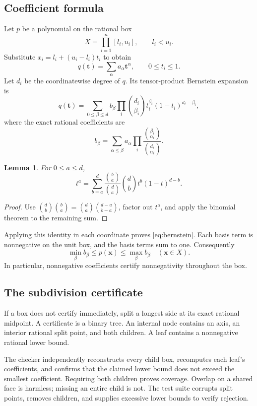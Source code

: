 \documentclass[11pt,a4paper]{article}
\newtheorem{lemma}[proposition]{Lemma}
\theoremstyle{definition}
\begin{document}
\subsection{Coefficient formula}

Let $p$ be a polynomial on the rational box
\[
 X=\prod_{i=1}^{n}[l_i,u_i],\qquad l_i<u_i.
\]
Substitute $x_i=l_i+(u_i-l_i)t_i$ to obtain
\[
 q(\bm t)=\sum_\alpha a_\alpha\bm t^\alpha,
 \qquad 0\le t_i\le1.
\]
Let $d_i$ be the coordinatewise degree of $q$. Its tensor-product Bernstein expansion is
\[
 q(\bm t)=\sum_{0\le\beta\le\bm d} b_\beta
   \prod_i\binom{d_i}{\beta_i}t_i^{\beta_i}(1-t_i)^{d_i-\beta_i},
\]
where the exact rational coefficients are
\begin{equation}
 b_\beta=\sum_{\alpha\le\beta}a_\alpha
     \prod_i\frac{\binom{\beta_i}{\alpha_i}}{\binom{d_i}{\alpha_i}}.
 \label{eq:bernstein}
\end{equation}

\begin{lemma}
For $0\le a\le d$,
\[
 t^a=\sum_{b=a}^{d}\frac{\binom ba}{\binom da}
                    \binom db t^b(1-t)^{d-b}.
\]
\end{lemma}
\begin{proof}
Use $\binom db\binom ba=\binom da\binom{d-a}{b-a}$, factor out $t^a$, and apply the binomial theorem to the remaining sum.
\end{proof}

Applying this identity in each coordinate proves \eqref{eq:bernstein}. Each basis term is nonnegative on the unit box, and the basis terms sum to one. Consequently
\[
 \min_\beta b_\beta\le p(\bm x)\le\max_\beta b_\beta
 \quad(\bm x\in X).
\]
In particular, nonnegative coefficients certify nonnegativity throughout the box.

\subsection{The subdivision certificate}

If a box does not certify immediately, split a longest side at its exact rational midpoint. A certificate is a binary tree. An internal node contains an axis, an interior rational split point, and both children. A leaf contains a nonnegative rational lower bound.

The checker independently reconstructs every child box, recomputes each leaf's coefficients, and confirms that the claimed lower bound does not exceed the smallest coefficient. Requiring both children proves coverage. Overlap on a shared face is harmless; missing an entire child is not. The test suite corrupts split points, removes children, and supplies excessive lower bounds to verify rejection.
\end{document}
